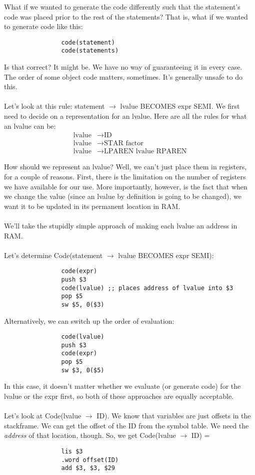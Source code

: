 \documentclass[]{article}
\theoremstyle{definition}
\begin{document}
				What if we wanted to generate the code differently such that the statement's code was placed prior to the rest of the statements? That is, what if we wanted to generate code like this:
				\begin{verbatim}
				code(statement)
				code(statements)
				\end{verbatim}

				Is that correct? It might be. We have no way of guaranteeing it in every case. The order of some object code matters, sometimes. It's generally unsafe to do this.
				\\ \\
				Let's look at this rule: statement $\to$ lvalue BECOMES expr SEMI. We first need to decide on a representation for an lvalue. Here are all the rules for what an lvalue can be:
				\begin{align*}
					\text{lvalue} &\to \text{ID} \\
					\text{lvalue} &\to \text{STAR factor} \\
					\text{lvalue} &\to \text{LPAREN lvalue RPAREN}
				\end{align*}

				How should we represent an lvalue? Well, we can't just place them in registers, for a couple of reasons. First, there is the limitation on the number of registers we have available for our use. More importantly, however, is the fact that when we change the value (since an lvalue by definition is going to be changed), we want it to be updated in its permanent location in RAM.
				\\ \\
				We'll take the stupidly simple approach of making each lvalue an address in RAM.
				\\ \\
				Let's determine Code(statement $\to$ lvalue BECOMES expr SEMI):
				\begin{verbatim}
				code(expr)
				push $3
				code(lvalue) ;; places address of lvalue into $3
				pop $5
				sw $5, 0($3)
				\end{verbatim}

				Alternatively, we can switch up the order of evaluation:
				\begin{verbatim}
				code(lvalue)
				push $3
				code(expr)
				pop $5
				sw $3, 0($5)
				\end{verbatim}

				In this case, it doesn't matter whether we evaluate (or generate code) for the lvalue or the expr first, so both of these approaches are equally acceptable.
				\\ \\
				Let's look at Code(lvalue $\to$ ID). We know that variables are just offsets in the stackframe. We can get the offset of the ID from the symbol table. We need the \emph{address} of that location, though. So, we get Code(lvalue $\to$ ID) =
				\begin{verbatim}
				lis $3
				.word offset(ID)
				add $3, $3, $29
				\end{verbatim}
\end{document}
